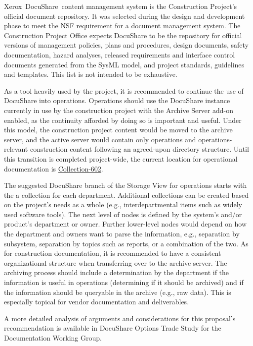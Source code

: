 Xerox\textregistered\ DocuShare\textregistered\ content management system \citep{DocuShare-cite} is the Construction Project's official document repository.
It was selected during the design and development phase to meet the NSF requirement for a document management system.
The Construction Project Office expects DocuShare to be the repository for official versions of management policies, plans and procedures, design documents, safety documentation, hazard analyses, released requirements and interface control documents generated from the SysML model, and project standards, guidelines and templates.
This list is not intended to be exhaustive.

As a tool heavily used by the project, it is recommended to continue the use of DocuShare into operations.
Operations should use the DocuShare instance currently in use by the construction project with the Archive Server add-on enabled, as the continuity afforded by doing so is important and useful.
Under this model, the construction project content would be moved to the archive server, and the active server would contain only operations and operations-relevant construction content following an agreed-upon directory structure.
Until this transition is completed project-wide, the current location for operational documentation is \href{https://docushare.lsstcorp.org/docushare/dsweb/View/Collection-602}{Collection-602}.

The suggested DocuShare branch of the Storage View for operations starts with the a collection for each department.
Additional collections can be created based on the project's needs as a whole (e.g., interdepartmental items such as widely used software tools).
The next level of nodes is defined by the system's and/or product's department or owner.
Further lower-level nodes would depend on how the department and owners want to parse the information, e.g., separation by subsystem, separation by topics such as reports, or a combination of the two.
As for construction documentation, it is recommended to have a consistent organizational structure when transferring over to the archive server.
The archiving process should include a determination by the department if the information is useful in operations (determining if it should be archived) and if the information should be queryable in the archive (e.g., raw data).
This is especially topical for vendor documentation and deliverables.

A more detailed analysis of arguments and considerations for this proposal's recommendation is available in DocuShare Options Trade Study for the Documentation Working Group. 

